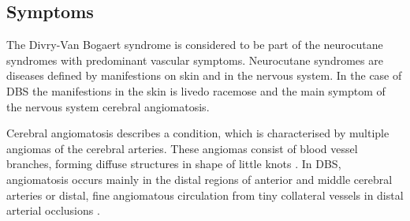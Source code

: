 \subsection{Symptoms}
\label{sec:Sec1.1.2}

The Divry-Van Bogaert syndrome is considered to be part of the neurocutane syndromes with predominant vascular symptoms.
Neurocutane syndromes are diseases defined by manifestions on skin and in the nervous system. \cite{doc,neurocutane_all,neurocutane}
In the case of DBS the manifestions in the skin is livedo racemose and the main symptom of the nervous system cerebral angiomatosis\cite{sds, cauf, dvf, dvbp}.

Cerebral angiomatosis describes a condition, which is characterised by multiple angiomas of the cerebral arteries.
These angiomas consist of blood vessel branches, forming diffuse structures in shape of little knots \cite{cauf}. 
In DBS, angiomatosis occurs mainly in the distal regions of anterior and middle cerebral arteries or distal, fine angiomatous circulation from tiny collateral vessels in distal arterial occlusions \cite{cauf,corr}. 


